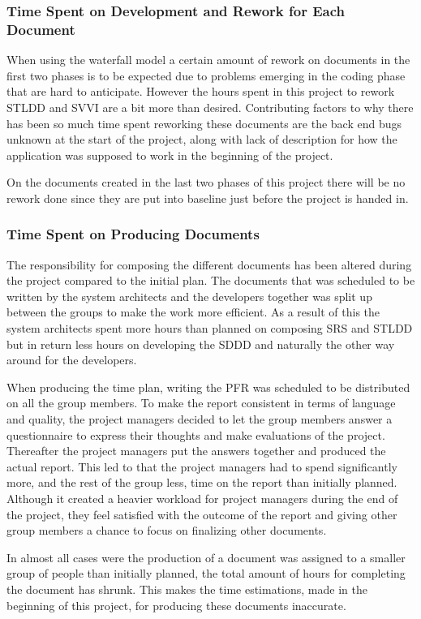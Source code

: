 \documentclass[a4paper]{article}
\begin{document}
\subsubsection{Time Spent on Development and Rework for Each Document} 
When using the waterfall model a certain amount of rework on documents in the first two phases is to be expected due to problems emerging in the coding phase that are hard to anticipate. However the hours spent in this project to rework STLDD and  SVVI are a bit more than desired. Contributing factors to why there has been so much time spent reworking these documents are the back end bugs unknown at the start of the project, along with lack of description for how the application was supposed to work in the beginning of the project.

On the documents created in the last two phases of this project there will be no rework done since they are put into baseline just before the project is handed in. 


\subsubsection{Time Spent on Producing Documents}
The responsibility for composing the different documents has been altered during the project compared to the initial plan. The documents that was scheduled to be written by the system architects and the developers together was split up between the groups to make the work more efficient. As a result of this the system architects spent more hours than planned on composing SRS and STLDD but in return less hours on developing the SDDD and naturally the other way around for the developers. 

When producing the time plan, writing the PFR was scheduled to be distributed on all the group members. To make the report consistent in terms of language and quality, the project managers decided to let the group members answer a questionnaire to express their thoughts  and make evaluations of the project. Thereafter the project managers put the answers together and produced the actual report. This led to that the project managers had to spend significantly more, and the rest of the group less, time on the report than initially planned. Although it created a heavier workload for project managers during the end of the project, they feel satisfied with the outcome of the report and giving other group members a chance to focus on finalizing other documents.

In almost all cases were the production of a document was assigned to a smaller group of people than initially planned, the total amount of hours for completing the document has shrunk. This makes the time estimations, made in the beginning of this project, for producing these documents inaccurate. 
\end{document}
